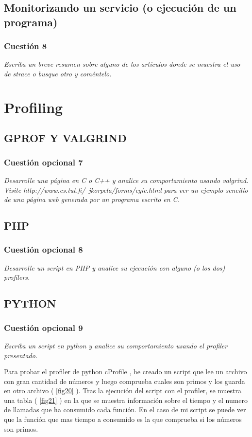 \subsection{Monitorizando un servicio (o ejecución de un programa)}

\subsubsection{Cuestión 8}
\textit{Escriba un breve resumen sobre alguno de los artículos donde se muestra el uso de strace o busque otro y coméntelo.}


\section{Profiling}
\subsection{GPROF Y VALGRIND}


\subsubsection{Cuestión opcional 7}
\textit{Desarrolle una página en C o C++ y analice su comportamiento usando valgrind. Visite http://www.cs.tut.fi/~jkorpela/forms/cgic.html para ver un ejemplo sencillo de una página web generada por un programa escrito en C.}
\subsection{PHP}


\subsubsection{Cuestión opcional 8}
\textit{Desarrolle un script en PHP y analice su ejecución con alguno (o los dos) profilers.}


\subsection{PYTHON}
\subsubsection{Cuestión opcional 9}
\textit{Escriba un script en python y analice su comportamiento usando el profiler presentado.}
\newline

Para probar el profiler de python cProfile \cite{cprofile}, he creado un script que lee un archivo con gran cantidad de números y luego comprueba cuales son primos y los guarda en otro archivo ( \cref{fig20} ). Tras la ejecución del script con el profiler, se muestra una tabla ( \cref{fig21} ) en la que se muestra información sobre el tiempo y el numero de llamadas que ha consumido cada función. En el caso de mi script se puede ver que la función que mas tiempo a consumido es la que comprueba si los números son primos.
\newline

